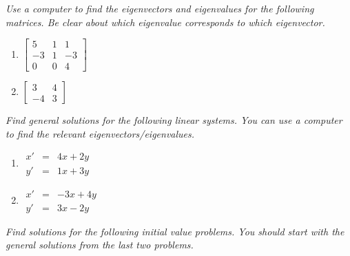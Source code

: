 \documentclass[10pt]{article}
\begin{document}
\noindent
\textit{Use a computer to find the eigenvectors and eigenvalues for the following matrices. Be clear about which eigenvalue corresponds to which eigenvector.}

\begin{multicols}{2}
\begin{enumerate}
\setcounter{enumi}{\theenumCount}
\item $\begin{bmatrix} 5 & 1 & 1 \\ -3 & 1 & -3 \\ 0 & 0 & 4 \end{bmatrix}$


\item $\begin{bmatrix} 3 & 4 \\ -4 & 3 \end{bmatrix}$

\setcounter{enumCount}{\theenumi}
\end{enumerate} 
\end{multicols}
\vfill

\noindent
\textit{Find general solutions for the following linear systems.  You can use a computer to find the relevant eigenvectors/eigenvalues.}

\begin{multicols}{2}
\begin{enumerate}
\setcounter{enumi}{\theenumCount}

\item $\begin{array}{ccc} x' & = & 4x + 2y \\ y' & = & 1x + 3y \end{array}$

\item $\begin{array}{ccc} x' & = & -3x + 4y \\ y' & = & 3x - 2y \end{array}$

\setcounter{enumCount}{\theenumi}
\end{enumerate} 
\end{multicols}
\vfill

\noindent
\textit{Find solutions for the following initial value problems. You should start with the general solutions from the last two problems. }
\end{document}
